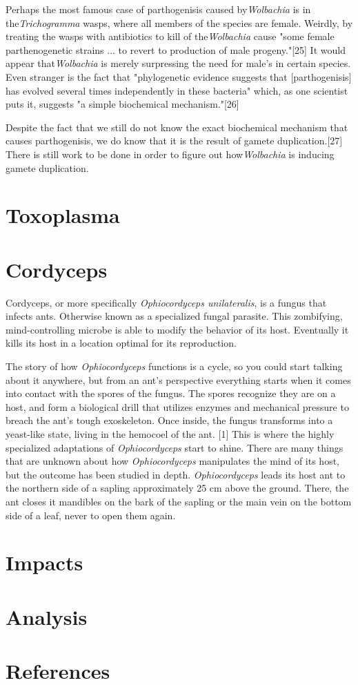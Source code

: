 \documentclass[twocolumn]{article}
\begin{document}
Perhaps the most famous case of parthogenisis caused by\textit{Wolbachia} is in the\textit{Trichogramma} wasps, where all members of the species are female. Weirdly, by treating the wasps with antibiotics to kill of the\textit{Wolbachia} cause "some female parthenogenetic strains ... to revert to production of male progeny."[25] It would appear that\textit{Wolbachia} is merely surpressing the need for male's in certain species. Even stranger is the fact that "phylogenetic evidence suggests that [parthogenisis] has evolved several times independently in these bacteria" which, as one scientist puts it, suggests "a simple biochemical mechanism."[26]  

Despite the fact that we still do not know the exact biochemical mechanism that causes parthogenisis, we do know that it is the result of gamete duplication.[27] There is still work to be done in order to figure out how\textit{Wolbachia} is inducing gamete duplication.

\section*{Toxoplasma}

\section*{Cordyceps}
Cordyceps, or more specifically \textit{Ophiocordyceps unilateralis}, is a fungus that infects ants. Otherwise known as a specialized fungal parasite. This zombifying, mind-controlling microbe is able to modify the behavior of its host. Eventually it kills its host in a location optimal for its reproduction. 

The story of how \textit{Ophiocordyceps} functions is a cycle, so you could start talking about it anywhere, but from an ant's perspective everything starts when it comes into contact with the spores of the fungus. The spores recognize they are on a host, and form a biological drill that utilizes enzymes and mechanical pressure to breach the ant's tough exoskeleton. Once inside, the fungus transforms into a yeast-like state, living in the hemocoel of the ant. [1] This is where the highly specialized adaptations of \textit{Ophiocordyceps} start to shine. There are many things that are unknown about how \textit{Ophiocordyceps} manipulates the mind of its host, but the outcome has been studied in depth. \textit{Ophiocordyceps} leads its host ant to the northern side of a sapling approximately 25 cm above the ground. There, the ant closes it mandibles on the bark of the sapling or the main vein on the bottom side of a leaf, never to open them again. 


\section*{Impacts}

\section*{Analysis}

\section*{References}

\printbibliography
\end{document}

